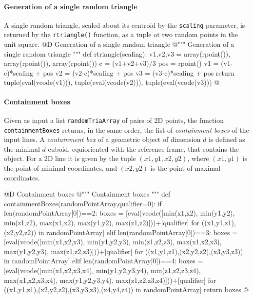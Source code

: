 \documentclass[11pt,oneside]{article}    %
\begin{document}
\paragraph{Generation of a single random triangle}
A single random triangle, scaled about its centroid by the \texttt{scaling} parameter, is returned by the \texttt{rtriangle()} function, as a tuple ot two random points in the unit square.
@D Generation of a single random triangle
@{""" Generation of a single random triangle """
def rtriangle(scaling):
    v1,v2,v3 = array(rpoint()), array(rpoint()), array(rpoint())
    c = (v1+v2+v3)/3
    pos = rpoint()
    v1 = (v1-c)*scaling + pos
    v2 = (v2-c)*scaling + pos
    v3 = (v3-c)*scaling + pos
    return tuple(eval(vcode(v1))), tuple(eval(vcode(v2))), tuple(eval(vcode(v3)))
@}
    

\paragraph{Containment boxes}

Given as input a list \texttt{randomTriaArray} of pairs of 2D points, the function \texttt{containmentBoxes} returns, in the same order, the list of \emph{containment boxes} of the input lines. A \emph{containment box} of a geometric object of dimension $d$ is defined as the minimal $d$-cuboid, equioriented with the reference frame, that contains the object. For a 2D line it is given by the tuple $(x1,y1,x2,y2)$, where $(x1,y1)$ is the point of minimal coordinates, and $(x2,y2)$ is the point of maximal  coordinates.

@D Containment boxes
@{""" Containment boxes """
def containmentBoxes(randomPointArray,qualifier=0):
    if len(randomPointArray[0])==2:
        boxes = [eval(vcode([min(x1,x2), min(y1,y2), min(z1,z2), 
                             max(x1,x2), max(y1,y2), max(z1,z2)]))+[qualifier]
                for ((x1,y1,z1),(x2,y2,z2)) in randomPointArray]
    elif len(randomPointArray[0])==3:
        boxes = [eval(vcode([min(x1,x2,x3), min(y1,y2,y3), min(z1,z2,z3), 
                             max(x1,x2,x3), max(y1,y2,y3), max(z1,z2,z3)]))+[qualifier]
                for ((x1,y1,z1),(x2,y2,z2),(x3,y3,z3)) in randomPointArray]
    elif len(randomPointArray[0])==4:
        boxes = [eval(vcode([min(x1,x2,x3,x4), min(y1,y2,y3,y4), min(z1,z2,z3,z4), 
                             max(x1,x2,x3,x4), max(y1,y2,y3,y4), max(z1,z2,z3,z4)]))+[qualifier]
                for ((x1,y1,z1),(x2,y2,z2),(x3,y3,z3),(x4,y4,z4)) in randomPointArray]
    return boxes
@}
\end{document}
